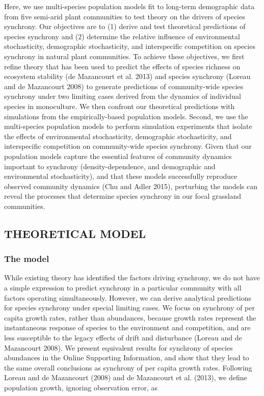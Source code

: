 \documentclass[12pt,]{article}
\begin{document}
Here, we use multi-species population models fit to long-term
demographic data from five semi-arid plant communities to test theory on
the drivers of species synchrony. Our objectives are to (1) derive and
test theoretical predictions of species synchrony and (2) determine the
relative influence of environmental stochasticity, demographic
stochasticity, and interspecific competition on species synchrony in
natural plant communities. To achieve these objectives, we first refine
theory that has been used to predict the effects of species richness on
ecosystem stability ({{de Mazancourt}} et al. 2013) and species
synchrony (Loreau and {{de Mazancourt}} 2008) to generate predictions of
community-wide species synchrony under two limiting cases derived from
the dynamics of individual species in monoculture. We then confront our
theoretical predictions with simulations from the empirically-based
population models. Second, we use the multi-species population models to
perform simulation experiments that isolate the effects of environmental
stochasticity, demographic stochasticity, and interspecific competition
on community-wide species synchrony. Given that our population models
capture the essential features of community dynamics important to
synchrony (density-dependence, and demographic and environmental
stochasticity), and that these models successfully reproduce observed
community dynamics (Chu and Adler 2015), perturbing the models can
reveal the processes that determine species synchrony in our focal
grassland communities.

\subsection{THEORETICAL MODEL}\label{theoretical-model}

\subsubsection{The model}\label{the-model}

While existing theory has identified the factors driving synchrony, we
do not have a simple expression to predict synchrony in a particular
community with all factors operating simultaneously. However, we can
derive analytical predictions for species synchrony under special
limiting cases. We focus on synchrony of per capita growth rates, rather
than abundances, because growth rates represent the instantaneous
response of species to the environment and competition, and are less
susceptible to the legacy effects of drift and disturbance (Loreau and
{{de Mazancourt}} 2008). We present equivalent results for synchrony of
species abundances in the Online Supporting Information, and show that
they lead to the same overall conclusions as synchrony of per capita
growth rates. Following Loreau and {{de Mazancourt}} (2008) and {{de
Mazancourt}} et al. (2013), we define population growth, ignoring
observation error, as
\end{document}
